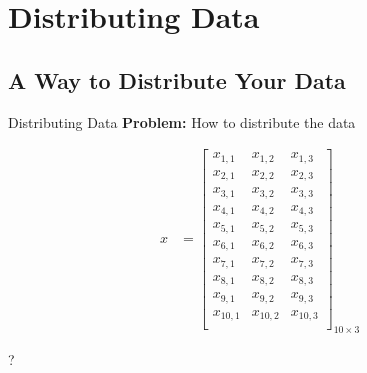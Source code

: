 \section{Distributing Data}
\makesubcontentsslides


\subsection{A Way to Distribute Your Data}
\makesubcontentsslidessec


\begin{frame}
  \begin{block}{Distributing Data}
  \centering
\textbf{Problem:}  How to distribute the data
\begin{center}
    \begin{minipage}{0.47\textwidth}
     \begin{center}
      \begin{align*}
      x &= \left[
            \begin{array}{lll}
            x_{1,1} & x_{1,2} & x_{1,3} \\
            x_{2,1} & x_{2,2} & x_{2,3} \\
            x_{3,1} & x_{3,2} & x_{3,3} \\
            x_{4,1} & x_{4,2} & x_{4,3} \\
            x_{5,1} & x_{5,2} & x_{5,3} \\
            x_{6,1} & x_{6,2} & x_{6,3} \\
            x_{7,1} & x_{7,2} & x_{7,3} \\
            x_{8,1} & x_{8,2} & x_{8,3} \\
            x_{9,1} & x_{9,2} & x_{9,3} \\
            x_{10,1} & x_{10,2} & x_{10,3} \\
            \end{array}
      \right]_{10\times 3}
      \end{align*}
     \end{center}
    \end{minipage}
    \begin{minipage}{0.47\textwidth}
    \centering
      {\fontsize{12cm}{1cm}\selectfont ? }
    \end{minipage}
    \end{center}
  \end{block}
\end{frame}



